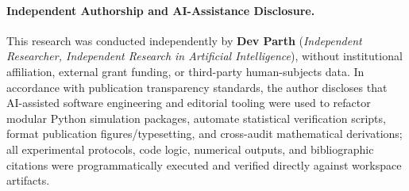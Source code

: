 \documentclass[10pt,letterpaper]{article}
\begin{document}
\paragraph{Independent Authorship and AI-Assistance Disclosure.}
This research was conducted independently by \textbf{Dev Parth} (\emph{Independent Researcher, Independent Research in Artificial Intelligence}), without institutional affiliation, external grant funding, or third-party human-subjects data. In accordance with publication transparency standards, the author discloses that AI-assisted software engineering and editorial tooling were used to refactor modular Python simulation packages, automate statistical verification scripts, format publication figures/typesetting, and cross-audit mathematical derivations; all experimental protocols, code logic, numerical outputs, and bibliographic citations were programmatically executed and verified directly against workspace artifacts.
\end{document}
